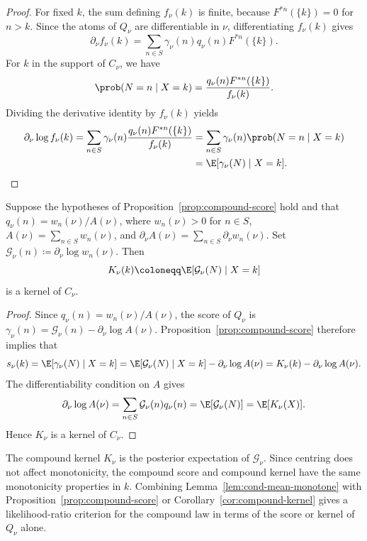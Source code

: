 \documentclass[11pt]{article}
\begin{document}
\begin{proof}
For fixed \(k\), the sum defining \(f_\nu(k)\) is finite, because \(F^{*n}(\{k\})=0\) for \(n>k\). Since the atoms of \(Q_\nu\) are differentiable in \(\nu\), differentiating \(f_\nu(k)\) gives
\[
\partial_\nu f_\nu(k)=\sum_{n\in S}\gamma_\nu(n)q_\nu(n)F^{*n}(\{k\}).
\]
For \(k\) in the support of \(C_\nu\), we have
\[
\prob(N=n\mid X=k)
=\frac{q_\nu(n)F^{*n}(\{k\})}{f_\nu(k)}.
\]
Dividing the derivative identity by \(f_\nu(k)\) yields
\begin{alignat*}{2}
\partial_\nu\log f_\nu(k)=\sum_{n\in S}\gamma_\nu(n)\frac{q_\nu(n)F^{*n}(\{k\})}{f_\nu(k)}
&=\sum_{n\in S}\gamma_\nu(n)\prob(N=n\mid X=k)\\&=\E[\gamma_\nu(N)\mid X=k].%
\end{alignat*}
\end{proof}

\begin{cor}
\label{cor:compound-kernel}

Suppose the hypotheses of Proposition~\ref{prop:compound-score} hold and that \(q_\nu(n)=w_n(\nu)/A(\nu)\), where \(w_n(\nu)>0\) for \(n\in S\), \(A(\nu)=\sum_{n\in S}w_n(\nu)\), and \(\partial_\nu A(\nu)=\sum_{n\in S}\partial_\nu w_n(\nu)\). Set \(\mathcal G_\nu(n)\coloneqq \partial_\nu\log w_n(\nu)\). Then
\[
K_\nu(k) \coloneqq \E[\mathcal G_\nu(N) \mid X = k]
\]
is a kernel of $C_\nu$.
\end{cor}

\begin{proof}
Since \(q_\nu(n)=w_n(\nu)/A(\nu)\), the score of $Q_\nu$ is $\gamma_\nu(n)=\mathcal G_\nu(n)-\partial_\nu\log A(\nu).$ Proposition~\ref{prop:compound-score} therefore implies that
\[
s_\nu(k)=\E[\gamma_\nu(N)\mid X=k]
=\E[\mathcal G_\nu(N)\mid X=k]-\partial_\nu\log A(\nu)
=K_\nu(k)-\partial_\nu\log A(\nu).
\]
The differentiability condition on \(A\) gives
\[
\partial_\nu\log A(\nu)=\sum_{n\in S}\mathcal G_\nu(n)q_\nu(n)=\E[\mathcal G_\nu(N)]=\E[K_\nu(X)].
\]
Hence \(K_\nu\) is a kernel of \(C_\nu\).
\end{proof}

The compound kernel \(K_\nu\) is the posterior expectation of \(\mathcal G_\nu\). Since centring does not affect monotonicity, the compound score and compound kernel have the same monotonicity properties in \(k\). Combining Lemma~\ref{lem:cond-mean-monotone} with Proposition~\ref{prop:compound-score} or Corollary~\ref{cor:compound-kernel} gives a likelihood-ratio criterion for the compound law in terms of the score or kernel of \(Q_\nu\) alone.
\end{document}
